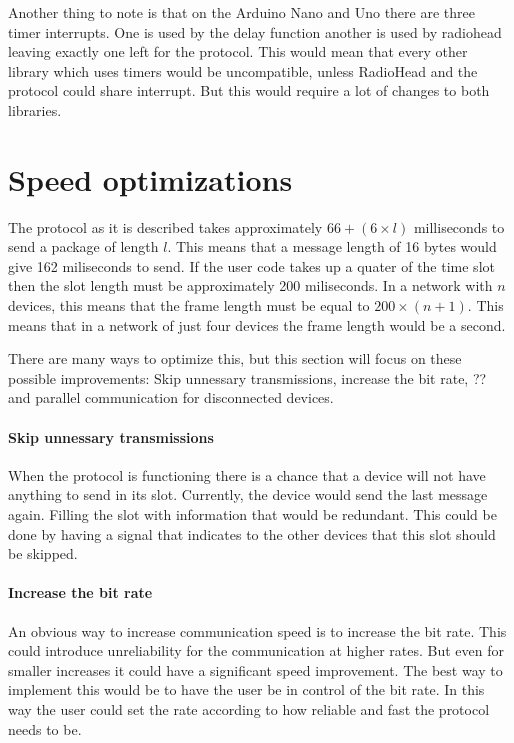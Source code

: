 Another thing to note is that on the Arduino Nano and Uno there are three timer interrupts.
One is used by the delay function another is used by radiohead leaving exactly one left for the protocol.
This would mean that every other library which uses timers would be uncompatible, unless RadioHead and the protocol could share interrupt.
But this would require a lot of changes to both libraries.

\section{Speed optimizations}

The protocol as it is described takes approximately $66 + (6 \times l)$ milliseconds to send a package of length $l$. 
This means that a message length of 16 bytes would give 162 miliseconds to send.
If the user code takes up a quater of the time slot then the slot length must be approximately 200 miliseconds.
In a network with $n$ devices, this means that the frame length must be equal to $200 \times (n + 1)$.
This means that in a network of just four devices the frame length would be a second.

There are many ways to optimize this, but this section will focus on these possible improvements: 
Skip unnessary transmissions, increase the bit rate, ?? and parallel communication for disconnected devices.

\paragraph{Skip unnessary transmissions} 
When the protocol is functioning there is a chance that a device will not have anything to send in its slot.
Currently, the device would send the last message again.
Filling the slot with information that would be redundant.
This could be done by having a signal that indicates to the other devices that this slot should be skipped.

\paragraph{Increase the bit rate} 
An obvious way to increase communication speed is to increase the bit rate.
This could introduce unreliability for the communication at higher rates. 
But even for smaller increases it could have a significant speed improvement.
The best way to implement this would be to have the user be in control of the bit rate.
In this way the user could set the rate according to how reliable and fast the protocol needs to be.

